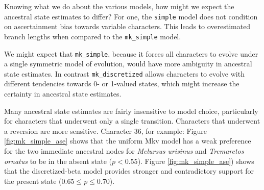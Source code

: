 Knowing what we do about the various models, how might we expect the ancestral state estimates to differ?
For one, the {\tt simple} model does not condition on ascertainment bias towards variable characters.
This leads to overestimated branch lengths when compared to the {\tt mk\_simple} model.

\begin{figure}[h!]
\label{fig:mk_discretized_ase}
\end{figure}

We might expect that {\tt mk\_simple}, because it forces all characters to evolve under a single symmetric model of evolution, would have more ambiguity in ancestral state estimates.
In contrast {\tt mk\_discretized} allows characters to evolve with different tendencies towards 0- or 1-valued states, which might increase the certainty in ancestral state estimates.

Many ancestral state estimates are fairly insensitive to model choice, particularly for characters that underwent only a single transition.
Characters that underwent a reversion are more sensitive.
Character 36, for example:
Figure \ref{fig:mk_simple_ase} shows that the uniform Mkv model has a weak preference for the two immediate ancestral nodes for {\it Melursus urisinus} and {\it Tremarctos ornatus} to be in the absent state ($p < 0.55$).
Figure \ref{fig:mk_simple_ase}) shows that the discretized-beta model provides stronger and contradictory support for the present state ($0.65 \leq p \leq 0.70$).



\newpage
